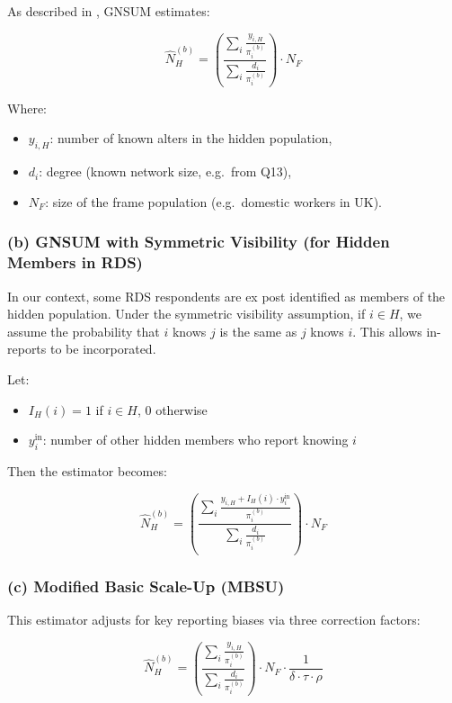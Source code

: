 \documentclass[
  12pt,
  letterpaper,
  DIV=11,
  numbers=noendperiod]{scrartcl}
\theoremstyle{plain}
\theoremstyle{definition}
\begin{document}
As described in \textcite{feeh16-generalizing}, GNSUM estimates:

\[\hat{N}_H^{(b)} = \left( \frac{\sum_{i} \frac{y_{i,H}}{\pi_i^{(b)}}}{\sum_{i} \frac{d_i}{\pi_i^{(b)}}} \right) \cdot N_F\]

Where:

\begin{itemize}
\item
  \(y_{i,H}\): number of known alters in the hidden population,
\item
  \(d_i\): degree (known network size, e.g.~from Q13),
\item
  \(N_F\): size of the frame population (e.g.~domestic workers in UK).
\end{itemize}

\subsubsection{(b) GNSUM with Symmetric Visibility (for Hidden Members
in
RDS)}\label{b-gnsum-with-symmetric-visibility-for-hidden-members-in-rds}

In our context, some RDS respondents are ex post identified as members
of the hidden population. Under the symmetric visibility assumption, if
\(i \in H\), we assume the probability that \(i\) knows \(j\) is the
same as \(j\) knows \(i\). This allows in-reports to be incorporated.

Let:

\begin{itemize}
\item
  \(I_H(i) = 1\) if \(i \in H\), 0 otherwise
\item
  \(y_{i}^{\text{in}}\): number of other hidden members who report
  knowing \(i\)
\end{itemize}

Then the estimator becomes:

\[\hat{N}_H^{(b)} = \left( \frac{\sum_{i} \frac{y_{i,H} + I_H(i) \cdot y_{i}^{\text{in}}}{\pi_i^{(b)}}}{\sum_{i} \frac{d_i}{\pi_i^{(b)}}} \right) \cdot N_F\]

\subsubsection{(c) Modified Basic Scale-Up
(MBSU)}\label{c-modified-basic-scale-up-mbsu}

This estimator adjusts for key reporting biases via three correction
factors:

\[\hat{N}_H^{(b)} = \left( \frac{\sum_{i} \frac{y_{i,H}}{\pi_i^{(b)}}}{\sum_{i} \frac{d_i}{\pi_i^{(b)}}} \right) \cdot N_F \cdot \frac{1}{\delta \cdot \tau \cdot \rho}\]
\end{document}
